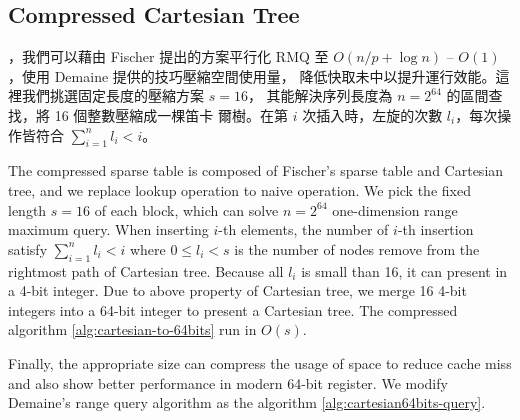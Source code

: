 \subsection{Compressed Cartesian Tree}

\iffalse 在 Fischer \cite{fischer} 的論文中，根據卡塔蘭數
$\frac{1}{s+1}\binom{2s}{s} = O(\frac{4^s}{s^{1.5}})$ 建立查找表
(lookup-table)，其中選擇 $s = \frac{1}{4} \log n$ 時，空間複雜度
$O(s^2 \frac{4^s}{s^{1.5}}) = o(n)$ 且建表複雜度 $o(n)$。每一個區間詢
問將會拆成 2 個 super-block 和 2 個 in-block 詢問，共計需要 4 次的記憶
體存取。在理論分析上，離線 RMQ 問題可在 $\theta(n)$ -- $\theta(1)$ 時
間內解決任一詢問。當 $n$ 越大時，這 4 次的記憶體存取會遭遇到嚴重的快取
未中 (cache miss)，在 Demaine ~\cite{demaine} 的論文中，發展出快取忘卻
(cache oblivious) 形式的查找方案，降低在離線版本中的 in-block 詢問產生
的快取未中。\fi


，我們可以藉由 Fischer 提出的方案平行化 RMQ 至
$O(n / p + \log n)$ -- $O(1)$，使用 Demaine 提供的技巧壓縮空間使用量，
降低快取未中以提升運行效能。這裡我們挑選固定長度的壓縮方案 $s = 16$，
其能解決序列長度為 $n = 2^{64}$ 的區間查找，將 16 個整數壓縮成一棵笛卡
爾樹。在第 $i$ 次插入時，左旋的次數 $l_i$，每次操作皆符合
$\sum_{i=1}^{n} l_i < i$。\fi

The compressed sparse table is composed of Fischer's sparse table and
Cartesian tree, and we replace lookup operation to naive operation. We
pick the fixed length $s = 16$ of each block, which can solve $n =
2^{64}$ one-dimension range maximum query.  When inserting $i$-th
elements, the number of $i$-th insertion satisfy $\sum_{i=1}^{n} l_i <
i$ where $0 \le l_i < s$ is the number of nodes remove from the
rightmost path of Cartesian tree.  Because all $l_i$ is small than 16,
it can present in a 4-bit integer.  Due to above property of Cartesian
tree, we merge 16 4-bit integers into a 64-bit integer to present a
Cartesian tree. The compressed algorithm \ref{alg:cartesian-to-64bits}
run in $O(s)$.




Finally, the appropriate size can compress the usage of space to
reduce cache miss and also show better performance in modern 64-bit
register.  We modify Demaine's range query algorithm as the algorithm
\ref{alg:cartesian64bits-query}.



\iffalse
因所有 $l_i < 16$，使得每個 $l_i$ 可用 4-bit 表示之，
整體便可用 64-bit 長整數表示一棵笛卡爾樹的狀態。
為了現在常見的 64-byte 快取列 (cache line) 和 64-bit 暫存器 (register) 考量，
我們選用合適的大小進行測試，不僅壓縮空間使用量，同時也減少快取未中的問題。
最後，我們得到壓縮算法 \ref{alg:cartesian-to-64bits}，其相對應的區間查找算法，
根據 Demaine \cite{demaine} 進行修改，得到壓縮下的詢問算法 \ref{alg:cartesian64bits-query}。
\fi

